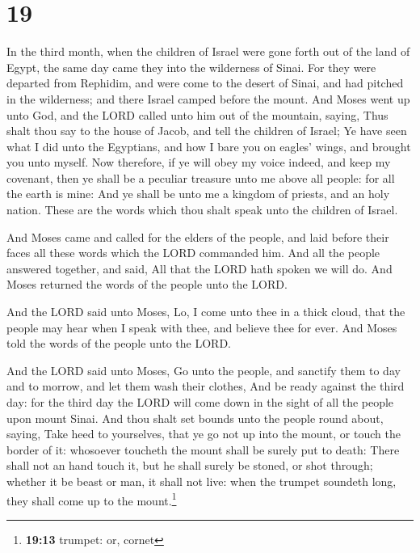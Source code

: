 \hypertarget{section-18}{%
\section{19}\label{section-18}}

 In the third month, when the children of Israel were gone
forth out of the land of Egypt, the same day came they into the
wilderness of Sinai.  For they were departed from
Rephidim, and were come to the desert of Sinai, and had pitched in the
wilderness; and there Israel camped before the mount.  And
Moses went up unto God, and the LORD called unto him out of the
mountain, saying, Thus shalt thou say to the house of Jacob, and tell
the children of Israel;  Ye have seen what I did unto the
Egyptians, and how I bare you on eagles' wings, and brought you unto
myself.  Now therefore, if ye will obey my voice indeed,
and keep my covenant, then ye shall be a peculiar treasure unto me above
all people: for all the earth is mine:  And ye shall be
unto me a kingdom of priests, and an holy nation. These are the words
which thou shalt speak unto the children of Israel.

 And Moses came and called for the elders of the people,
and laid before their faces all these words which the LORD commanded
him.  And all the people answered together, and said, All
that the LORD hath spoken we will do. And Moses returned the words of
the people unto the LORD.

 And the LORD said unto Moses, Lo, I come unto thee in a
thick cloud, that the people may hear when I speak with thee, and
believe thee for ever. And Moses told the words of the people unto the
LORD.

 And the LORD said unto Moses, Go unto the people, and
sanctify them to day and to morrow, and let them wash their clothes,
 And be ready against the third day: for the third day
the LORD will come down in the sight of all the people upon mount Sinai.
 And thou shalt set bounds unto the people round about,
saying, Take heed to yourselves, that ye go not up into the mount, or
touch the border of it: whosoever toucheth the mount shall be surely put
to death:  There shall not an hand touch it, but he shall
surely be stoned, or shot through; whether it be beast or man, it shall
not live: when the trumpet soundeth long, they shall come up to the
mount.\footnote{\textbf{19:13} trumpet: or, cornet}

